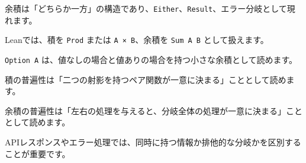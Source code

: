 余積は「どちらか一方」の構造であり、\texttt{Either}、\texttt{Result}、エラー分岐として現れます。

Leanでは、積を \texttt{Prod} または \texttt{A × B}、余積を \texttt{Sum A B} として扱えます。

\texttt{Option A} は、値なしの場合と値ありの場合を持つ小さな余積として読めます。

積の普遍性は「二つの射影を持つペア関数が一意に決まる」こととして読めます。

余積の普遍性は「左右の処理を与えると、分岐全体の処理が一意に決まる」こととして読めます。

APIレスポンスやエラー処理では、同時に持つ情報か排他的な分岐かを区別することが重要です。
